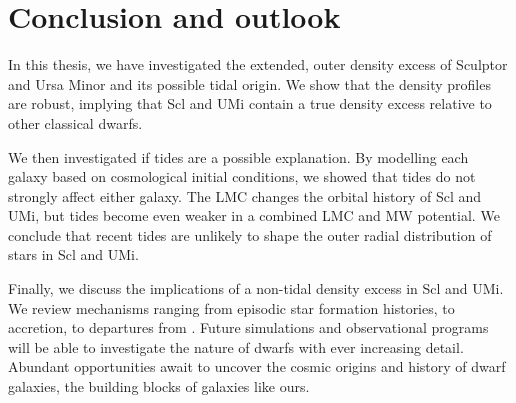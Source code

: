 \section{Conclusion and outlook}\label{conclusion-and-outlook}

In this thesis, we have investigated the extended, outer density excess
of Sculptor and Ursa Minor and its possible tidal origin. We show that
the density profiles are robust, implying that Scl and UMi contain a
true density excess relative to other classical dwarfs.

We then investigated if tides are a possible explanation. By modelling
each galaxy based on cosmological initial conditions, we showed that
tides do not strongly affect either galaxy. The LMC changes the orbital
history of Scl and UMi, but tides become even weaker in a combined LMC
and MW potential. We conclude that recent tides are unlikely to shape
the outer radial distribution of stars in Scl and UMi.

Finally, we discuss the implications of a non-tidal density excess in
Scl and UMi. We review mechanisms ranging from episodic star formation
histories, to accretion, to departures from \LCDM{}. Future simulations
and observational programs will be able to investigate the nature of
dwarfs with ever increasing detail. Abundant opportunities await to
uncover the cosmic origins and history of dwarf galaxies, the building
blocks of galaxies like ours.
